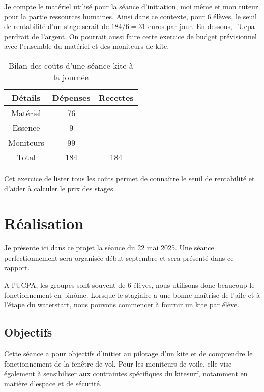 \documentclass[11pt,a4paper]{report}
\begin{document}
Je compte le matériel utilisé pour la séance d’initiation,
moi m\^eme et mon tuteur pour la partie ressources humaines.
Ainsi dans ce contexte,  pour 6 élèves, le seuil de rentabilité
d'un stage serait de $184/6 = 31$ euros
par jour. En dessous, l'Ucpa perdrait de l'argent.
On pourrait aussi faire cette exercice de budget prévisionnel avec
l'ensemble du matériel et des moniteurs de kite.

\begin{table}
\begin{centering}
\begin{tabular}{|c|c|c|}
\hline
\textbf{Détails}         & \textbf{Dépenses} & \textbf{Recettes}   \\
\hline
Matériel  & 76     &                     \\
\hline                                    
Essence   & 9      &                     \\
\hline              
Moniteurs  & 99    &                     \\
\hline
Total     & 184    &       184           \\
\hline
\end{tabular}
\caption{Bilan des co\^uts d'une séance kite à la journée\label{cout_journalier}}
\end{centering}
\end{table}

Cet exercice de lister tous les co\^uts permet de connaître le seuil 
de rentabilité et d'aider à calculer le prix des stages.
\FloatBarrier
\section{Réalisation}
Je présente ici dans ce projet la séance du 22 mai 2025.
Une séance perfectionnement sera organisée début septembre
et sera présenté dans ce rapport.

A l'UCPA, les groupes sont souvent de 6 élèves, nous
utilisons donc beaucoup le fonctionnement en bin\^ome. 
Lorsque le stagiaire a une bonne maîtrise de l'aile et
à l'étape du waterstart, nous pouvons commencer à fournir
un kite par élève.
\subsection{Objectifs}
Cette séance a pour objectifs d’initier au pilotage d’un kite et
de comprendre le fonctionnement de la fenêtre de vol. 
Pour les moniteurs de voile, elle vise également à 
sensibiliser aux contraintes spécifiques du kitesurf, 
notamment en matière d’espace et de sécurité.
 
\end{document}
